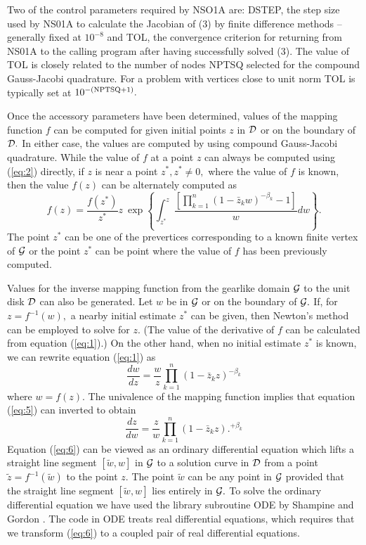 \documentclass[12pt]{article}%
\begin{document}
Two of the control parameters required by NSO1A are: DSTEP, the step
size used by NS01A to calculate the Jacobian of (3) by
finite difference methods -- generally fixed at $10^{-8}$ and TOL,
the convergence criterion for returning from NS01A to the calling
program after having successfully solved (3).  The value of TOL is
closely related to the number of nodes NPTSQ selected for the
compound Gauss-Jacobi quadrature.  For a problem with vertices close
to unit norm TOL is typically set at $10^{{\rm -(NPTSQ+1)}}.$

Once the accessory parameters have been determined, values of the
mapping function $f$ can be computed for given initial points $z$ in
${\cal D}$ or on the boundary of ${\cal D}.$ In either case, the
values are computed by using compound Gauss-Jacobi quadrature.  While
the value of $f$ at a point $z$ can always be computed using (\ref{eq:2})
directly, if $z$ is near a point $z^* , z^* \neq 0,$ where the value
of $f$ is known, then the value $f(z)$ can be alternately computed as
$$f(z)=\frac{f(z^*)}{z^*}z\
\exp\left\{\int^z_{z^*}\frac{\left[\displaystyle{\prod^n_{k=1}}(1-\bar{z}_kw)^{-\beta_k}-1
\right]}{w}dw\right\}.$$ The point $z^*$ can be one of the prevertices
corresponding to a known finite vertex of ${\cal G}$ or the point
$z^*$ can be point where the value of $f$ has been previously
computed. 

Values for the inverse mapping function from the gearlike domain
${\cal G}$ to the unit disk ${\cal D}$ can also be generated.  Let
$w$ be in ${\cal G}$ or on the boundary of ${\cal G}.$ If, for $z =
f^{-1} (w),$ a nearby initial estimate $z^*$ can be given, then
Newton's method can be employed to solve for $z.$ (The value of the
derivative of $f$ can be calculated from equation (\ref{eq:1}).)  On
the other hand, when no initial estimate $z^*$ is known, we can
rewrite equation (\ref{eq:1}) as
\begin{equation}\frac{dw}{dz}=\frac{w}{z}\prod^n_{k=1}(1-\bar{z}_kz)^{-\beta_k}\label{eq:5}\end{equation}
where $w = f(z).$ The univalence of the mapping function implies that
equation
(\ref{eq:5}) can inverted to obtain
\begin{equation}\frac{dz}{dw}=\frac{z}{w}\prod^n_{k=1}(1-\bar{z}_kz).^{+\beta_k}\label{eq:6}\end{equation}
Equation (\ref{eq:6}) can be viewed as an ordinary differential
equation which lifts a straight line segment $[\tilde{w} ,w]$ in
${\cal G}$ to a solution curve in ${\cal D}$ from a point $\tilde{z}
= f^{-1} (\tilde{w})$ to the point $z.$ The point $\tilde{w}$ can be
any point in ${\cal G}$ provided that the straight line segment
$[\tilde{w} ,w]$ lies entirely in ${\cal G}.$ To solve the ordinary
differential equation we have used the library subroutine ODE by
Shampine and Gordon \cite{9}.  The code in ODE treats real differential
equations, which requires that we transform (\ref{eq:6}) to a coupled
pair of real differential equations.
\end{document}
